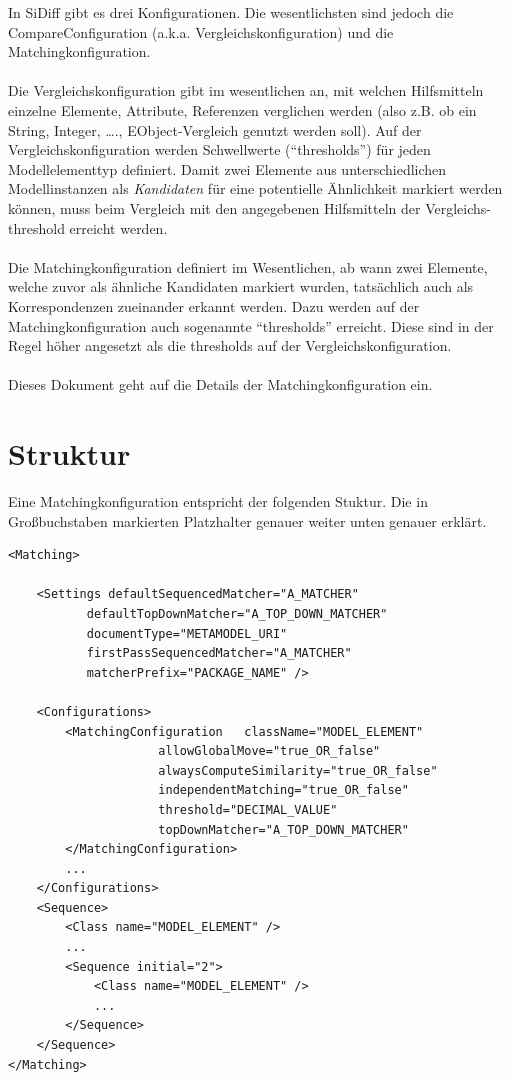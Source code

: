 \documentclass{article}
\begin{document}
In SiDiff gibt es drei Konfigurationen.
Die wesentlichsten sind jedoch die CompareConfiguration (a.k.a.
Vergleichskonfiguration) und die Matchingkonfiguration.
\\\\
Die Vergleichskonfiguration gibt im wesentlichen an, mit welchen Hilfsmitteln
einzelne Elemente, Attribute, Referenzen verglichen werden (also z.B. ob ein
String, Integer, \ldots., EObject-Vergleich genutzt werden soll).
Auf der Vergleichskonfiguration werden Schwellwerte (``thresholds'') für jeden
Modellelementtyp definiert. Damit zwei Elemente aus unterschiedlichen
Modellinstanzen als \textit{Kandidaten} für eine potentielle Ähnlichkeit
markiert werden können, muss beim Vergleich mit den angegebenen Hilfsmitteln der Vergleichs-threshold
erreicht werden.
\\\\
Die Matchingkonfiguration definiert im Wesentlichen, ab wann zwei Elemente,
welche zuvor als ähnliche Kandidaten markiert wurden, tatsächlich auch als
Korrespondenzen zueinander erkannt werden. Dazu werden auf der
Matchingkonfiguration auch sogenannte ``thresholds'' erreicht. Diese sind in
der Regel höher angesetzt als die thresholds auf der Vergleichskonfiguration.
\\\\
Dieses Dokument geht auf die Details der Matchingkonfiguration ein.

\section{Struktur}
Eine Matchingkonfiguration entspricht der folgenden Stuktur.
Die in Großbuchstaben markierten Platzhalter genauer weiter unten genauer
erklärt.
\begin{verbatim}
<Matching>

	<Settings defaultSequencedMatcher="A_MATCHER"
		   defaultTopDownMatcher="A_TOP_DOWN_MATCHER"
		   documentType="METAMODEL_URI"
		   firstPassSequencedMatcher="A_MATCHER"
		   matcherPrefix="PACKAGE_NAME" />

	<Configurations>
		<MatchingConfiguration	 className="MODEL_ELEMENT"
					 allowGlobalMove="true_OR_false"
					 alwaysComputeSimilarity="true_OR_false" 			
					 independentMatching="true_OR_false" 
					 threshold="DECIMAL_VALUE" 
					 topDownMatcher="A_TOP_DOWN_MATCHER"
		</MatchingConfiguration>
		...
	</Configurations>
	<Sequence>		
		<Class name="MODEL_ELEMENT" />
		...
		<Sequence initial="2">
			<Class name="MODEL_ELEMENT" />
			...
		</Sequence>
	</Sequence>
</Matching>
\end{verbatim}
\end{document}
